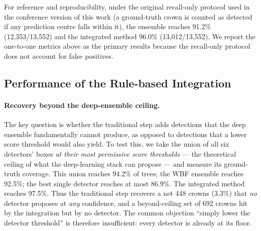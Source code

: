 For reference and reproducibility, under the original recall-only protocol used
in the conference version of this work (a ground-truth crown is counted as
detected if any prediction centre falls within it), the ensemble reaches
91.2\% (12{,}353/13{,}552) and the integrated method 96.0\% (13{,}012/13{,}552).
We report the one-to-one metrics above as the primary results because the
recall-only protocol does not account for false positives.


\subsection{Performance of the Rule-based Integration}

\paragraph{Recovery beyond the deep-ensemble ceiling.}
The key question is whether the traditional step adds detections that the deep
ensemble fundamentally cannot produce, as opposed to detections that a lower
score threshold would also yield. To test this, we take the union of all six
detectors' boxes \emph{at their most permissive score thresholds} --- the
theoretical ceiling of what the deep-learning stack can propose --- and measure
its ground-truth coverage. This union reaches 94.2\% of trees; the WBF ensemble
reaches 92.5\%; the best single detector reaches at most 86.9\%. The integrated
method reaches 97.5\%. Thus the traditional step recovers a net 448 crowns
(3.3\%) that \emph{no} detector proposes at \emph{any} confidence, and a
beyond-ceiling set of 692 crowns hit by the integration but by no detector. The
common objection ``simply lower the detector threshold'' is therefore
insufficient: every detector is already at its floor.

